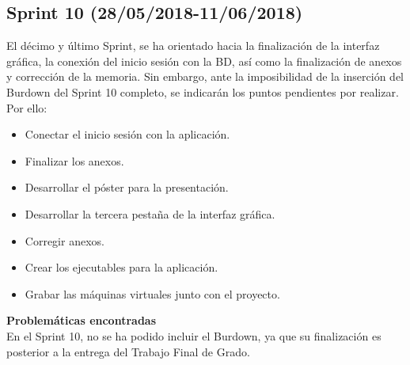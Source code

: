 \subsection{\textbf{Sprint 10} (28/05/2018-11/06/2018) }
El décimo y último Sprint, se ha orientado hacia la finalización de la interfaz gráfica, la conexión del inicio sesión con la BD, así como la finalización de anexos y corrección de la memoria. Sin embargo, ante la imposibilidad de la inserción del Burdown del Sprint 10 completo, se indicarán los puntos pendientes por realizar. 
Por ello: 
\begin{itemize}
\item Conectar el inicio sesión con la aplicación. 
\item Finalizar los anexos. 
\item Desarrollar el póster para la presentación. 
\item Desarrollar la tercera pestaña de la interfaz gráfica. 
\item Corregir anexos. 
\item Crear los ejecutables para la aplicación. 
\item Grabar las máquinas virtuales junto con el proyecto. 

\end{itemize}
\textbf{Problemáticas encontradas}\\En el Sprint 10, no se ha podido incluir el Burdown, ya que su finalización es posterior a la entrega del Trabajo Final de Grado. 
\\
